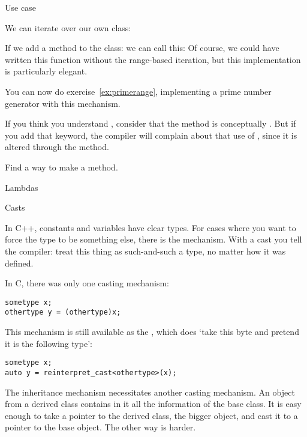 \begin{block}{Use case}
  \label{sl:bagfind}

  We can iterate over our own class:
\end{block}

If we add a method  to the class:
%
%
we can call this:
%
%
Of course, we could have written this function
without the range-based iteration, but this implementation is
particularly elegant.

\begin{exercise}
  You can now do exercise~\ref{ex:primerange}, implementing a prime
  number generator with this mechanism.
\end{exercise}

If you think you understand , consider that the 
method is conceptually . But if you add that keyword, the
compiler will complain about that use of , since it is
altered through the  method.

\begin{exercise}
  \label{ex:rangeconstiter}
  Find a way to make  a  method.
\end{exercise}

 {Lambdas}
\label{sec:lambda}


 {Casts}
\label{sec:cast}

In C++, constants and variables have clear types. For cases where you
want to force the type to be something else, there is the
 mechanism. With a cast you tell the compiler:
treat this thing as such-and-such a type, no matter how it was
defined.

In C, there was only one casting mechanism:
\begin{lstlisting}
sometype x;
othertype y = (othertype)x;
\end{lstlisting}
This mechanism is still available as the
, which does `take this byte and pretend
it is the following type':
\begin{lstlisting}
sometype x;
auto y = reinterpret_cast<othertype>(x);
\end{lstlisting}

The inheritance mechanism necessitates another casting mechanism.
An object from a derived class contains in it all the information of
the base class. It is easy enough to take a pointer to the derived
class, the bigger object, and cast it to a pointer to the base object.
The other way is harder.

